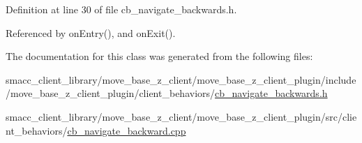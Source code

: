Definition at line 30 of file cb\+\_\+navigate\+\_\+backwards.\+h.



Referenced by on\+Entry(), and on\+Exit().



The documentation for this class was generated from the following files\+:\begin{DoxyCompactItemize}
\item 
smacc\+\_\+client\+\_\+library/move\+\_\+base\+\_\+z\+\_\+client/move\+\_\+base\+\_\+z\+\_\+client\+\_\+plugin/include/move\+\_\+base\+\_\+z\+\_\+client\+\_\+plugin/client\+\_\+behaviors/\hyperlink{cb__navigate__backwards_8h}{cb\+\_\+navigate\+\_\+backwards.\+h}\item 
smacc\+\_\+client\+\_\+library/move\+\_\+base\+\_\+z\+\_\+client/move\+\_\+base\+\_\+z\+\_\+client\+\_\+plugin/src/client\+\_\+behaviors/\hyperlink{cb__navigate__backward_8cpp}{cb\+\_\+navigate\+\_\+backward.\+cpp}\end{DoxyCompactItemize}
